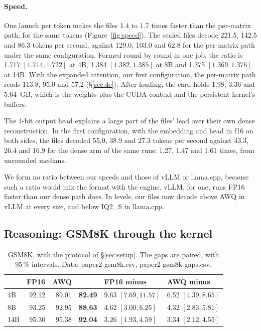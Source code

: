 \paragraph{Speed.} One launch per token makes the files 1.4 to 1.7 times
faster than the per-matrix path, for the same tokens
(Figure~\ref{fig:speed}). The sealed files decode 221.5, 142.5 and 86.3 tokens
per second, against 129.0, 103.0 and 62.8 for the per-matrix path under the
same configuration. Formed round by round in one job, the ratio is 1.717
$[1.714, 1.722]$ at 4B, 1.384 $[1.382, 1.385]$ at 8B and 1.375
$[1.369, 1.376]$ at 14B. With the expanded attention, our first
configuration, the per-matrix path reads 113.8, 95.0 and 57.2
(\S\ref{sec:4e}). After loading, the card holds 1.98, 3.36 and 5.64~GB, which
is the weights plus the CUDA context and the persistent kernel's buffers.

The 4-bit output head explains a large part of the files' lead over their own
dense reconstruction. In the first configuration, with the embedding and head
in f16 on both sides, the files decoded 55.0, 38.9 and 27.3 tokens per second
against 43.3, 26.4 and 16.9 for the dense arm of the same runs: 1.27, 1.47 and
1.61 times, from unrounded medians.

We form no ratio between our speeds and those of vLLM or llama.cpp, because
such a ratio would mix the format with the engine. vLLM, for one, runs FP16
faster than our dense path does. In levels, our files now decode above AWQ in
vLLM at every size, and below IQ2\_S in llama.cpp.

\subsection{Reasoning: GSM8K through the kernel}
\label{sec:gsm8k}

\begin{table}[t]
\centering\small\setlength{\tabcolsep}{5pt}
\caption{GSM8K, with the protocol of \S\ref{sec:setup}. The gaps are paired,
with 95\,\% intervals. Data: paper2-gsm8k.csv, paper2-gsm8k-gaps.csv.}
\label{tab:gsm8k}
\begin{tabular}{lrrrll}
\toprule
 & FP16 & AWQ & \Tetra{} & FP16 minus \Tetra{} & AWQ minus \Tetra{}\\
\midrule
4B & 92.12 & 89.01 & \textbf{82.49} & 9.63 $[7.69, 11.57]$ & 6.52 $[4.39, 8.65]$\\
8B & 93.25 & 92.95 & \textbf{88.63} & 4.62 $[3.00, 6.25]$ & 4.32 $[2.83, 5.81]$\\
14B & 95.30 & 95.38 & \textbf{92.04} & 3.26 $[1.93, 4.59]$ & 3.34 $[2.12, 4.55]$\\
\bottomrule
\end{tabular}
\end{table}

